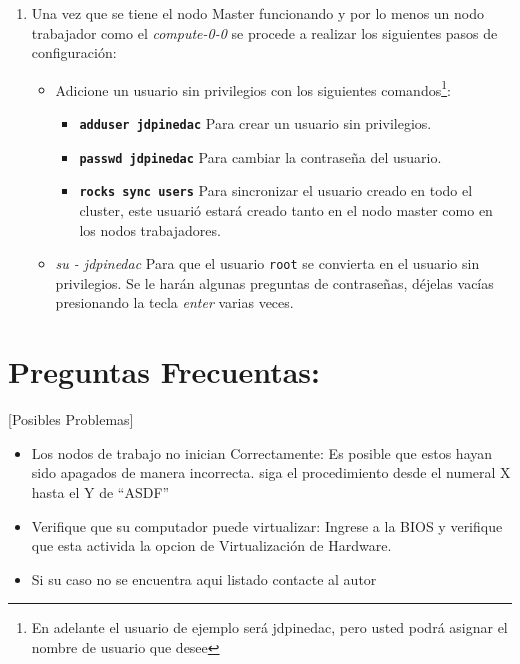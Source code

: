 \begin{enumerate}
	\item Una vez que se tiene el nodo Master funcionando y por lo menos un nodo trabajador como el \textit{compute-0-0} se procede a realizar los siguientes pasos de configuración:

	\begin{itemize}
	\item Adicione un usuario sin privilegios con los siguientes comandos\footnote{En adelante el usuario de ejemplo será jdpinedac, pero usted podrá asignar el nombre de usuario que desee}:

	\begin{itemize}
		\item \textbf{\texttt{adduser jdpinedac}} Para crear un usuario sin privilegios.

		\item \textbf{\texttt{passwd jdpinedac}} Para cambiar la contraseña del usuario.

		\item \textbf{\texttt{rocks sync users}} Para sincronizar el usuario creado en todo el cluster, este usuarió estará creado tanto en el nodo master como en los nodos trabajadores.
	\end{itemize}

	\item \textit{su - jdpinedac} Para que el usuario \texttt{root} se convierta en el usuario sin privilegios. Se le harán algunas preguntas de contraseñas, déjelas vacías presionando la tecla \textit{enter} varias veces.
	\end{itemize}
	
\end{enumerate}


\section{Preguntas Frecuentas:}[Posibles Problemas]

\begin{itemize}
	\item Los nodos de trabajo no inician Correctamente: Es posible que estos hayan sido apagados de manera incorrecta. 
	siga el procedimiento desde el numeral X hasta el Y de ``ASDF''

	\item Verifique que su computador puede virtualizar: Ingrese a la BIOS y verifique que esta activida la opcion de Virtualización de Hardware. 

	\item Si su caso no se encuentra aqui listado contacte al autor
\end{itemize}